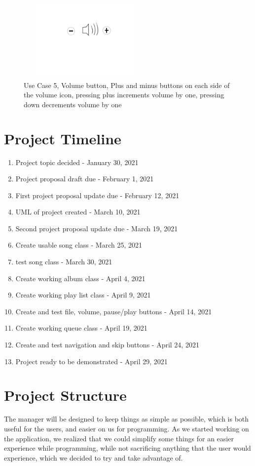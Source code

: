 \documentclass[10pt,conference,onecolumn,compsoc]{IEEEtran}
\begin{document}
\begin{figure}
\includegraphics[height=150px, width=250px]{Volume_Button_Mock_Up.jpg}
\caption{Use Case 5, Volume button, Plus and minus buttons on each side of the volume icon, pressing plus increments volume by one, pressing down decrements volume by one}
\label{VolumeButton}
\end{figure}

\section{Project Timeline}
\begin{enumerate}
\item Project topic decided - January 30, 2021
\item Project proposal draft due - February 1, 2021
\item First project proposal update due - February 12, 2021
\item UML of project created - March 10, 2021
\item Second project proposal update due - March 19, 2021
\item Create usable song class - March 25, 2021
\item test song class - March 30, 2021
\item Create working album class - April 4, 2021
\item Create working play list class - April 9, 2021
\item Create and test file, volume, pause/play buttons - April 14, 2021
\item Create working queue class - April 19, 2021
\item Create and test navigation and skip buttons - April 24, 2021
\item Project ready to be demonstrated - April 29, 2021
\end{enumerate}

\section{Project Structure}
The manager will be designed to keep things as simple as possible, which is both useful for the users, and easier on us for programming. As we started working on the application, we realized that we could simplify some things for an easier experience while programming, while not sacrificing anything that the user would experience, which we decided to try and take advantage of.
\end{document}
